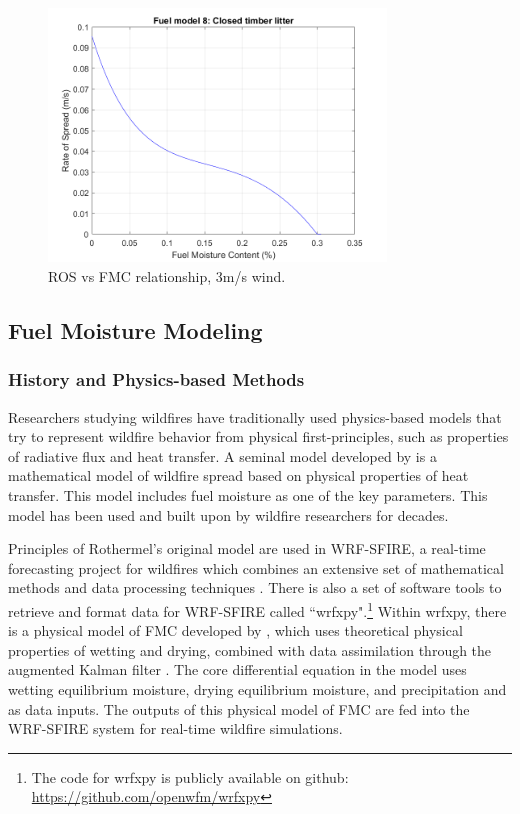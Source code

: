 \documentclass[11pt]{article}%
\begin{document}
\begin{figure}[p]
    \centering
    \includegraphics[width=0.8\textwidth]{images/fuel8_ros_fm_3wind.png}
    \caption{ROS vs FMC relationship, 3m/s wind.}
    \label{fig:fmc_ros_3wind}
\end{figure}

\subsection{Fuel Moisture Modeling}

\subsubsection{History and Physics-based Methods}
\hfill

Researchers studying wildfires have traditionally used physics-based models that try to represent wildfire behavior from physical first-principles, such as properties of radiative flux and heat transfer. A seminal model developed by \cite{Rothermel-1972-MMP} is a mathematical model of wildfire spread based on physical properties of heat transfer. This model includes fuel moisture as one of the key parameters. This model has been used and built upon by wildfire researchers for decades. 

Principles of Rothermel's original model are used in WRF-SFIRE, a real-time forecasting project for wildfires which combines an extensive set of mathematical methods and data processing techniques \citep{OpenWFM-2024-HTD}. There is also a set of software tools to retrieve and format data for WRF-SFIRE called ``wrfxpy".\footnote{The code for wrfxpy is publicly available on github: \url{https://github.com/openwfm/wrfxpy}} Within wrfxpy, there is a physical model of FMC developed by \citet{Mandel-2014-RAA}, which uses theoretical physical properties of wetting and drying, combined with data assimilation through the augmented Kalman filter \citep{Vejmelka-2016-DAD}. The core differential equation in the model uses wetting equilibrium moisture, drying equilibrium moisture, and precipitation and as data inputs. The outputs of this physical model of FMC are fed into the WRF-SFIRE system for real-time wildfire simulations.
\end{document}
